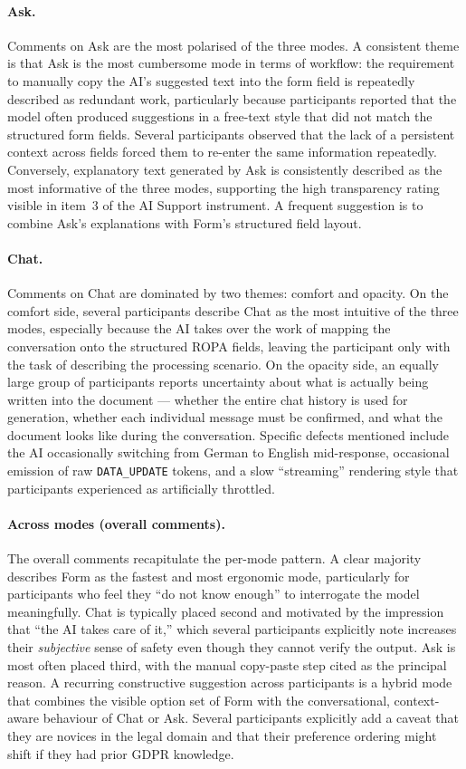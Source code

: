 \paragraph{Ask.} Comments on Ask are the most polarised of the three modes.
A consistent theme is that Ask is the most cumbersome mode in terms of
workflow: the requirement to manually copy the AI's suggested text into the
form field is repeatedly described as redundant work, particularly because
participants reported that the model often produced suggestions in a
free-text style that did not match the structured form fields. Several
participants observed that the lack of a persistent context across fields
forced them to re-enter the same information repeatedly. Conversely,
explanatory text generated by Ask is consistently described as the most
informative of the three modes, supporting the high transparency rating
visible in item~3 of the AI Support instrument. A frequent suggestion is
to combine Ask's explanations with Form's structured field layout.

\paragraph{Chat.} Comments on Chat are dominated by two themes: comfort and
opacity. On the comfort side, several participants describe Chat as the most
intuitive of the three modes, especially because the AI takes over the work
of mapping the conversation onto the structured ROPA fields, leaving the
participant only with the task of describing the processing scenario. On
the opacity side, an equally large group of participants reports
uncertainty about what is actually being written into the document — whether
the entire chat history is used for generation, whether each individual
message must be confirmed, and what the document looks like during the
conversation. Specific defects mentioned include the AI occasionally
switching from German to English mid-response, occasional emission of raw
\texttt{DATA\_UPDATE} tokens, and a slow ``streaming'' rendering style that
participants experienced as artificially throttled.

\paragraph{Across modes (overall comments).} The overall comments
recapitulate the per-mode pattern. A clear majority describes Form as the
fastest and most ergonomic mode, particularly for participants who feel they
``do not know enough'' to interrogate the model meaningfully. Chat is
typically placed second and motivated by the impression that ``the AI takes
care of it,'' which several participants explicitly note increases their
\emph{subjective} sense of safety even though they cannot verify the
output. Ask is most often placed third, with the manual copy-paste step
cited as the principal reason. A recurring constructive suggestion across
participants is a hybrid mode that combines the visible option set of Form
with the conversational, context-aware behaviour of Chat or Ask. Several
participants explicitly add a caveat that they are novices in the legal
domain and that their preference ordering might shift if they had prior
GDPR knowledge.
